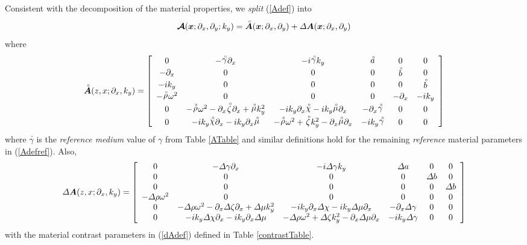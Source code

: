 \documentclass[11pt,a4paper]{article}
\newcommand{\CB}[1]{\mbox{\boldmath$\cal #1$\unboldmath}}
\newcommand{\bmi}[1]{\mbox{\boldmath$\mit #1$\unboldmath}}
\newcommand{\rf}[1]{\stackrel{\scriptscriptstyle _{\,\,\circ}}{ #1}}
\begin{document}
Consistent with the decomposition of the material properties, we
 {\em split\/} (\ref{Adef}) into
\begin{equation} \label{Asplit}
{\CB A}({\bmi x};{\partial }_{x},{\partial }_{y};k_y)=
{\rf{\bmi A}}({\bmi x};{\partial }_{x},{\partial }_{y})
+{{\mit \Delta} {\bmi A}}({\bmi x};{\partial }_{x},{\partial }_{y})
\end{equation}
where
\begin{equation} \label{Adefref}
{\rf{\bmi A}}(z,x;{\partial }_{x},{k}_{y})=\left[{\begin{array}{cccccc}
0&- {\rf \gamma} {\partial }_{  x}&  -i {\rf \gamma} {  k}_{  y}&  {\rf a}&0&0\\ -{ \partial
}_{x}&0&0&0&{\rf b}&0\\ -i{k}_{y}&0&0&0&0&{\rf b}\\ - {\rf \rho} {\omega }^{
2}&  0&0&0&-{ \partial }_{x}&-i{k}_{y}\\ 0&- {\rf \rho} {\omega
}^{  2}  -{ \partial }_{x} {\rf \zeta} {\partial }_{
x}  + {\rf \mu} {  k}_{  y}^{  2}&
-i{k}_{y}{ \partial }_{x} {\rf \chi}   -i{k}_{y} {\rf \mu} {\partial
}_{  x}&  -{ \partial }_{x} {\rf \gamma} &  0&0\\
0&-i{k}_{y} {\rf \chi} {\partial }_{  x}  -i{k}_{y}{ \partial
}_{x} {\rf \mu} &  - {\rf \rho} {\omega }^{  2}  + {\rf \zeta }
{  k}_{  y}^{  2}  -{ \partial }_{x} {\rf \mu}
{\partial }_{  x}&  -i{k}_{y} {\rf \gamma} &
0&0\end{array}}\right]
\end{equation}
where ${\rf \gamma}$ is the {\em reference medium\/} value of ${\gamma}$
from Table \ref{ATable} and similar definitions hold for the remaining
{\em reference\/} material parameters
in (\ref{Adefref}). Also,
\begin{equation} \label{dAdef}
{{\mit \Delta} {\bmi A}}(z,x;{\partial }_{x},{k}_{y})=\left[{\begin{array}{cccccc}
0&- {{\mit \Delta} \gamma} {\partial }_{  x}&  -i {{\mit \Delta} \gamma} {  k}_{  y}&
{{\mit \Delta} a}&0&0\\0&0&0&0&{{\mit \Delta} b}&0\\ 0&0&0&0&0&{{\mit \Delta} b}\\ - {{\mit \Delta} \rho} {\omega }^{
2}&  0&0&0&0&0\\ 0&- {{\mit \Delta} \rho} {\omega
}^{  2}  -{ \partial }_{x} {{\mit \Delta} \zeta} {\partial }_{
x}  + {{\mit \Delta} \mu} {  k}_{  y}^{  2}&
-i{k}_{y}{ \partial }_{x} {{\mit \Delta} \chi}   -i{k}_{y} {{\mit \Delta} \mu} {\partial
}_{  x}&  -{ \partial }_{x} {{\mit \Delta} \gamma} &  0&0\\
0&-i{k}_{y} {{\mit \Delta} \chi} {\partial }_{  x}  -i{k}_{y}{ \partial
}_{x} {{\mit \Delta} \mu} &  - {{\mit \Delta} \rho} {\omega }^{  2}  + {{\mit \Delta} \zeta }
{  k}_{  y}^{  2}  -{ \partial }_{x} {{\mit \Delta} \mu}
{\partial }_{  x}&  -i{k}_{y} {{\mit \Delta} \gamma} &  0&0\end{array}}\right]
\end{equation}
with the material contrast parameters in (\ref{dAdef}) defined in Table \ref{contrastTable}.
\end{document}
